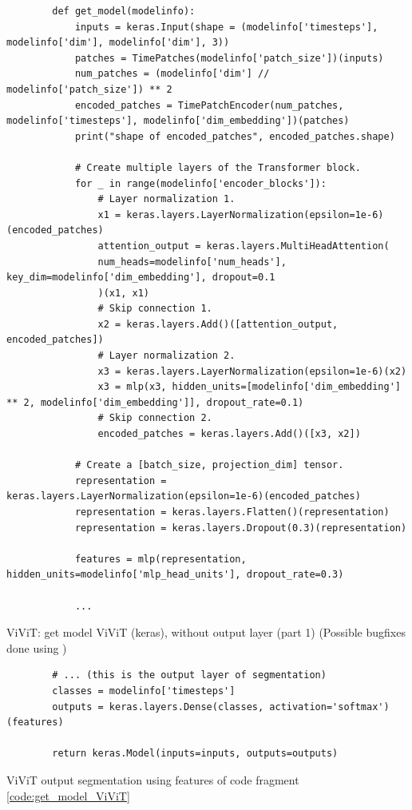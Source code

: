 \begin{listing}
    \begin{verbatim}
        def get_model(modelinfo):
            inputs = keras.Input(shape = (modelinfo['timesteps'], modelinfo['dim'], modelinfo['dim'], 3))
            patches = TimePatches(modelinfo['patch_size'])(inputs)
            num_patches = (modelinfo['dim'] // modelinfo['patch_size']) ** 2
            encoded_patches = TimePatchEncoder(num_patches, modelinfo['timesteps'], modelinfo['dim_embedding'])(patches)
            print("shape of encoded_patches", encoded_patches.shape)

            # Create multiple layers of the Transformer block.
            for _ in range(modelinfo['encoder_blocks']):
                # Layer normalization 1.
                x1 = keras.layers.LayerNormalization(epsilon=1e-6)(encoded_patches)
                attention_output = keras.layers.MultiHeadAttention(
                num_heads=modelinfo['num_heads'], key_dim=modelinfo['dim_embedding'], dropout=0.1
                )(x1, x1)
                # Skip connection 1.
                x2 = keras.layers.Add()([attention_output, encoded_patches])
                # Layer normalization 2.
                x3 = keras.layers.LayerNormalization(epsilon=1e-6)(x2)
                x3 = mlp(x3, hidden_units=[modelinfo['dim_embedding'] ** 2, modelinfo['dim_embedding']], dropout_rate=0.1)
                # Skip connection 2.
                encoded_patches = keras.layers.Add()([x3, x2])

            # Create a [batch_size, projection_dim] tensor.
            representation = keras.layers.LayerNormalization(epsilon=1e-6)(encoded_patches)
            representation = keras.layers.Flatten()(representation)
            representation = keras.layers.Dropout(0.3)(representation)

            features = mlp(representation, hidden_units=modelinfo['mlp_head_units'], dropout_rate=0.3)

            ...

    \end{verbatim}
    \caption[get model ViViT]{ViViT: get model ViViT (keras), without output layer (part 1)
    (Possible bugfixes done using \textcite{OpenAI_ChatGPT_2025})}
    \label{code:get_model_ViViT}
\end{listing}

\begin{listing}
    \begin{verbatim}
        # ... (this is the output layer of segmentation)
        classes = modelinfo['timesteps']
        outputs = keras.layers.Dense(classes, activation='softmax')(features)

        return keras.Model(inputs=inputs, outputs=outputs)
    \end{verbatim}
    \caption[ViViT output segmentation]{ViViT output segmentation using features of code fragment \ref{code:get_model_ViViT}}
    \label{code:ViViT-output-segmentation}
\end{listing}


